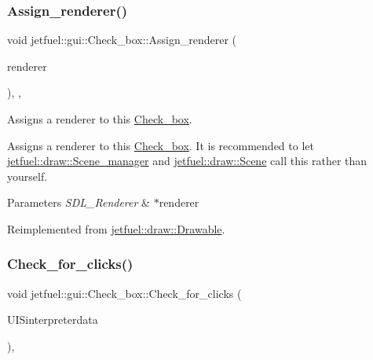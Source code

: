 \subsubsection{\texorpdfstring{Assign\+\_\+renderer()}{Assign\_renderer()}}
{\footnotesize\ttfamily void jetfuel\+::gui\+::\+Check\+\_\+box\+::\+Assign\+\_\+renderer (\begin{DoxyParamCaption}\item[{S\+D\+L\+\_\+\+Renderer $\ast$}]{renderer }\end{DoxyParamCaption})\hspace{0.3cm}{\ttfamily [inline]}, {\ttfamily [override]}, {\ttfamily [virtual]}}



Assigns a renderer to this \hyperlink{classjetfuel_1_1gui_1_1Check__box}{Check\+\_\+box}. 

Assigns a renderer to this \hyperlink{classjetfuel_1_1gui_1_1Check__box}{Check\+\_\+box}. It is recommended to let \hyperlink{classjetfuel_1_1draw_1_1Scene__manager}{jetfuel\+::draw\+::\+Scene\+\_\+manager} and \hyperlink{classjetfuel_1_1draw_1_1Scene}{jetfuel\+::draw\+::\+Scene} call this rather than yourself.


\begin{DoxyParams}{Parameters}
{\em S\+D\+L\+\_\+\+Renderer} & $\ast$renderer \\
\hline
\end{DoxyParams}


Reimplemented from \hyperlink{classjetfuel_1_1draw_1_1Drawable_a0d7257f197d6ffcdd89c3a99c93d1400}{jetfuel\+::draw\+::\+Drawable}.

\mbox{\label{classjetfuel_1_1gui_1_1Check__box_a0e50420591dbd64f07f02f9ee7cec637}} 
\subsubsection{\texorpdfstring{Check\+\_\+for\+\_\+clicks()}{Check\_for\_clicks()}}
{\footnotesize\ttfamily void jetfuel\+::gui\+::\+Check\+\_\+box\+::\+Check\+\_\+for\+\_\+clicks (\begin{DoxyParamCaption}\item[{\hyperlink{structjetfuel_1_1control_1_1Action}{jetfuel\+::control\+::\+Action}}]{U\+I\+Sinterpreterdata }\end{DoxyParamCaption})\hspace{0.3cm}{\ttfamily [override]}, {\ttfamily [virtual]}}



